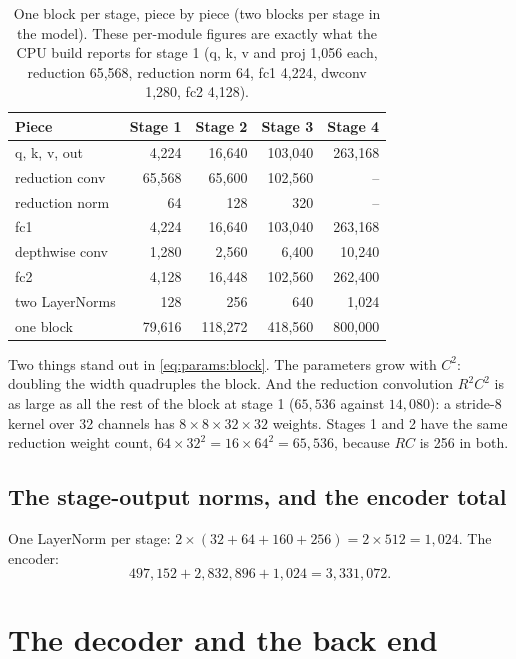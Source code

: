 \begin{table}[htbp]\centering
\caption{One block per stage, piece by piece (two blocks per stage in the model). These per-module
figures are exactly what the CPU build reports for stage 1 (q, k, v and proj 1,056 each, reduction
65,568, reduction norm 64, fc1 4,224, dwconv 1,280, fc2 4,128).}\label{tab:params:blockdetail}
\begin{tabular}{@{}lrrrr@{}}\toprule
Piece & Stage 1 & Stage 2 & Stage 3 & Stage 4 \\\midrule
q, k, v, out & 4,224 & 16,640 & 103,040 & 263,168 \\
reduction conv & 65,568 & 65,600 & 102,560 & -- \\
reduction norm & 64 & 128 & 320 & -- \\
fc1 & 4,224 & 16,640 & 103,040 & 263,168 \\
depthwise conv & 1,280 & 2,560 & 6,400 & 10,240 \\
fc2 & 4,128 & 16,448 & 102,560 & 262,400 \\
two LayerNorms & 128 & 256 & 640 & 1,024 \\\midrule
one block & 79,616 & 118,272 & 418,560 & 800,000 \\\bottomrule
\end{tabular}
\end{table}

Two things stand out in \eqref{eq:params:block}. The parameters grow with $C^2$: doubling the width
quadruples the block. And the reduction convolution $R^2 C^2$ is as large as all the rest of the block
at stage 1 ($65{,}536$ against $14{,}080$): a stride-8 kernel over 32 channels has $8 \times 8 \times 32
\times 32$ weights. Stages 1 and 2 have the same reduction weight count, $64 \times 32^2 = 16 \times
64^2 = 65{,}536$, because $R C$ is 256 in both.

\subsection{The stage-output norms, and the encoder total}

One LayerNorm per stage: $2 \times (32 + 64 + 160 + 256) = 2 \times 512 = 1{,}024$. The encoder:
\[
497{,}152 + 2{,}832{,}896 + 1{,}024 = 3{,}331{,}072 .
\]

\section{The decoder and the back end}\label{sec:params:decoder}

